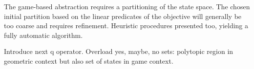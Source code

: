 The game-based abstraction requires a partitioning of the state space.
The chosen initial partition based on the linear predicates of the objective will generally be too coarse and requires refinement.
Heuristic procedures presented too, yielding a fully automatic algorithm.

Introduce next q operator. %
Overload yes, maybe, no sets: polytopic region in geometric context but also set of states in game context.

